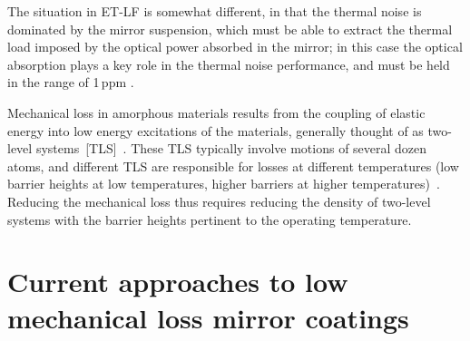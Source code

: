 The situation in ET-LF is somewhat different, in that the thermal noise is dominated by the mirror suspension, which must be able to extract the thermal load imposed by the optical power absorbed in the mirror; in this case the optical absorption plays a key role in the thermal noise performance, and must be held in the range of 1\,ppm \cite{HiEA2011}.


Mechanical loss in amorphous materials results from the coupling of elastic energy into low energy excitations of the materials, generally thought of as two-level systems~[TLS]~\cite{braginsky1985systems,bommel1956dislocations}. These TLS typically involve motions of several dozen atoms, and different TLS are responsible for losses at different temperatures (low barrier heights at low temperatures, higher barriers at higher temperatures)~\cite{hamdan2014molecular,trinastic2016molecular}. Reducing the mechanical loss thus requires reducing the density of two-level systems with the barrier heights pertinent to the operating temperature. 


\section{Current approaches to low mechanical loss mirror coatings}

